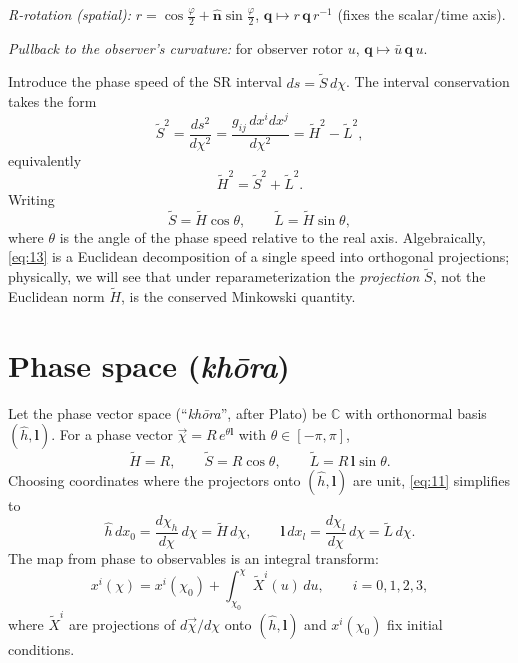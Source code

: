 \documentclass[11pt]{article}
\numberwithin{equation}{section}
\begin{document}
\emph{R-rotation (spatial):} $r=\cos\frac{\varphi}{2}+\hat{\mathbf n}\sin\frac{\varphi}{2}$,\quad
$\displaystyle \mathbf q \mapsto r\,\mathbf q\,r^{-1}$ (fixes the scalar/time axis).

\emph{Pullback to the observer's curvature:} for observer rotor $u$,
$\displaystyle \mathbf q \mapsto \bar u\, \mathbf q\, u$.


Introduce the phase speed of the SR interval $ds=\tilde{S}\,d\chi$. The interval conservation takes the form
\begin{equation}
\tilde{S}^2=\frac{ds^2}{d\chi^2}
=\frac{g_{ij}\,dx^i dx^j}{d\chi^2}
=\tilde{H}^2-\tilde{L}^2,
\label{eq:12}
\end{equation}
equivalently
\begin{equation}
\tilde{H}^2=\tilde{S}^2+\tilde{L}^2.
\label{eq:13}
\end{equation}
Writing 
\begin{equation}
\tilde{S}=\tilde{H}\cos\theta,\qquad \tilde{L}=\tilde{H}\sin\theta,
\label{eq:14}
\end{equation}
where $\theta$ is the angle of the phase speed relative to the real axis. Algebraically, \eqref{eq:13} is a Euclidean decomposition of a single speed into orthogonal projections; physically, we will see that under reparameterization the \emph{projection} $\tilde{S}$, not the Euclidean norm $\tilde{H}$, is the conserved Minkowski quantity.

\section{Phase space (\textit{kh\={o}ra})}
Let the phase vector space (``\emph{kh\={o}ra}'', after Plato) be $\mathbb{C}$ with orthonormal basis $(\hat{h},\mathbf{l})$. For a phase vector $\vec{\chi}=R\,e^{\theta\mathbf{l}}$ with $\theta\in[-\pi,\pi]$,
\begin{equation}
\tilde{H}=R,\qquad \tilde{S}=R\cos\theta,\qquad \tilde{L}=R\,\mathbf{l}\sin\theta.
\label{eq:21}
\end{equation}
Choosing coordinates where the projectors onto $(\hat{h},\mathbf{l})$ are unit, \eqref{eq:11} simplifies to
\begin{equation}
\hat{h}\,dx_0=\frac{d\chi_h}{d\chi}\,d\chi=\tilde{H}\,d\chi,\qquad
\mathbf{l}\,dx_l=\frac{d\chi_l}{d\chi}\,d\chi=\tilde{L}\,d\chi.
\label{eq:22}
\end{equation}
The map from phase to observables is an integral transform:
\begin{equation}
x^i(\chi)=x^i(\chi_0)+\int_{\chi_0}^{\chi}\tilde{X}^i(u)\,du,\qquad i=0,1,2,3,
\label{eq:23}
\end{equation}
where $\tilde{X}^i$ are projections of $d\vec{\chi}/d\chi$ onto $(\hat{h},\mathbf{l})$ and $x^i(\chi_0)$ fix initial conditions.
\end{document}
